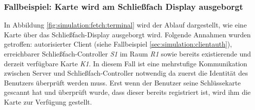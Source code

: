 \subsubsection{Fallbeispiel: Karte wird am Schließfach Display ausgeborgt}
In Abbildung \ref{fig:simulation:fetch:terminal} wird der Ablauf dargestellt, wie eine Karte über das Schließfach-Display ausgeborgt wird. Folgende Annahmen wurden getroffen: autorisierter Client (siehe Fallbeispiel \ref{sec:simulation:clientauth}), erreichbarer Schließfach-Controller \textit{S1} im Raum \textit{R1} sowie bereits existierende und derzeit verfügbare Karte \textit{K1}. In diesem Fall ist eine mehrstufige Kommunikation zwischen Server und Schließfach-Controller notwendig da zuerst die Identität des Benutzers überprüft werden muss. Erst wenn der Benutzer seine Schlüssekarte gescannt hat und überprüft wurde, dass dieser bereits registriert ist, wird ihm die Karte zur Verfügung gestellt. 
\vspace*{\fill}
\begin{center}
    \label{fig:simulation:fetch:terminal}
\end{center}
\vspace*{\fill}

